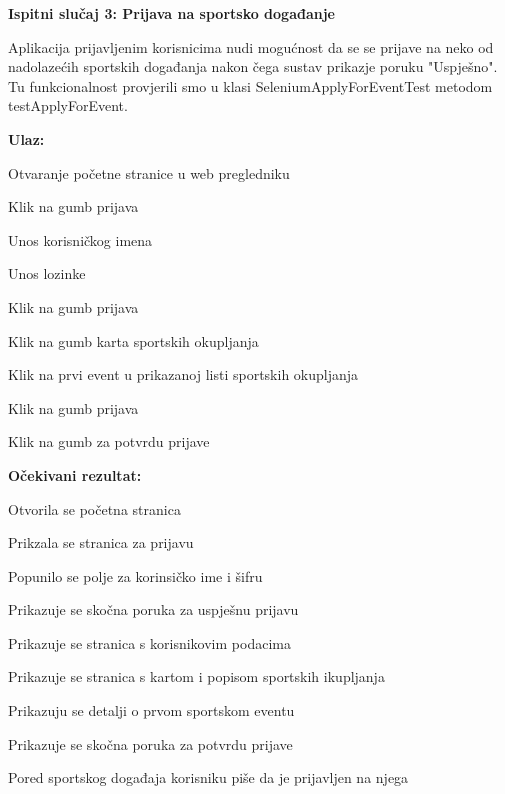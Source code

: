 		\hfill\break
		\noindent\textbf{Ispitni slučaj 3: Prijava na sportsko događanje}
		
		Aplikacija prijavljenim korisnicima nudi mogućnost da se se prijave na neko od nadolazećih sportskih događanja nakon čega sustav prikazje poruku "Uspješno".
		Tu funkcionalnost provjerili smo u klasi SeleniumApplyForEventTest metodom testApplyForEvent.
		
		\hfill\break
		\noindent\textbf{Ulaz:}
		
		\begin{packed_enum}
			
				\item Otvaranje početne stranice u web pregledniku
			 	\item Klik na gumb prijava
			 	\item Unos korisničkog imena
			 	\item Unos lozinke
			 	\item Klik na gumb prijava
			 	\item Klik na gumb karta sportskih okupljanja
			 	\item Klik na prvi event u prikazanoj listi sportskih okupljanja
			 	\item Klik na gumb prijava
			 	\item Klik na gumb za potvrdu prijave
			
		\end{packed_enum}
		
		\noindent\textbf{Očekivani rezultat:}
		
		\begin{packed_enum}
			
				\item Otvorila se početna stranica
			 	\item Prikzala se stranica za prijavu
			 	\item Popunilo se polje za korinsičko ime i šifru
			 	\item Prikazuje se skočna poruka za uspješnu prijavu
			 	\item Prikazuje se stranica s korisnikovim podacima
			 	\item Prikazuje se stranica s kartom i popisom sportskih ikupljanja
			 	\item Prikazuju se detalji o prvom sportskom eventu
			 	\item Prikazuje se skočna poruka za potvrdu prijave
			 	\item Pored sportskog događaja korisniku piše da je prijavljen na njega
			 	
				
				
		\end{packed_enum}
		
